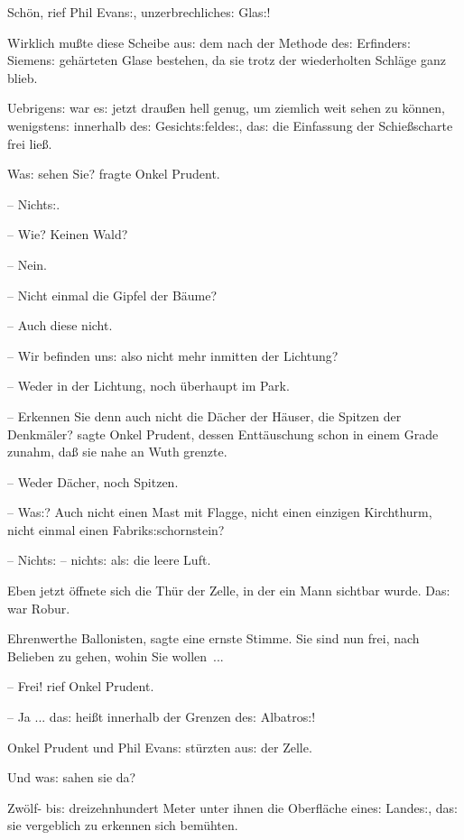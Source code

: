 \documentclass[oneside,12pt]{book}
\newcommand{\s}{s:}
\begin{document}
{\glqq}Sch\"on, rief Phil Evan{\s}, unzerbrechliche{\s} Gla{\s}!{\grqq}

Wirklich mu{\ss}te diese Scheibe au{\s} dem nach der Methode de{\s}
Erfinder{\s} Siemen{\s} geh\"arteten Glase bestehen, da sie trotz der
wiederholten Schl\"age ganz blieb.

Uebrigen{\s} war e{\s} jetzt drau{\ss}en hell genug, um ziemlich weit
sehen zu k\"onnen, wenigsten{\s} innerhalb de{\s}
Gesicht{\s}felde{\s}, da{\s} die Einfassung der Schie{\ss}scharte
frei lie{\ss}.

{\glqq}Wa{\s} sehen Sie? fragte Onkel Prudent.

-- Nicht{\s}.

-- Wie? Keinen Wald?

-- Nein.

-- Nicht einmal die Gipfel der B\"aume?

-- Auch diese nicht.

-- Wir befinden un{\s} also nicht mehr inmitten der Lichtung?

-- Weder in der Lichtung, noch \"uberhaupt im Park.

-- Erkennen Sie denn auch nicht die D\"acher der H\"auser, die
Spitzen der Denkm\"aler? sagte Onkel Prudent, dessen Entt\"auschung
schon in einem Grade zunahm, da{\ss} sie nahe an Wuth grenzte.

-- Weder D\"acher, noch Spitzen.

-- Wa{\s}? Auch nicht einen Mast mit Flagge, nicht einen einzigen
Kirchthurm, nicht einmal einen Fabrik{\s}schornstein?

-- Nicht{\s} -- nicht{\s} al{\s} die leere Luft.{\grqq}

Eben jetzt \"offnete sich die Th\"ur der Zelle, in der ein Mann
sichtbar wurde. Da{\s} war Robur.

{\glqq}Ehrenwerthe Ballonisten, sagte eine ernste Stimme. Sie sind
nun frei, nach Belieben zu gehen, wohin Sie wollen~...

-- Frei! rief Onkel Prudent.

-- Ja ... da{\s} hei{\ss}t innerhalb der Grenzen de{\s}
{\glqq}Albatro{\s}{\grqq}!

Onkel Prudent und Phil Evan{\s} st\"urzten au{\s} der Zelle.

Und wa{\s} sahen sie da?

Zw\"olf- bi{\s} dreizehnhundert Meter unter ihnen die Oberfl\"ache
eine{\s} Lande{\s}, da{\s} sie vergeblich zu erkennen sich
bem\"uhten.
\end{document}
